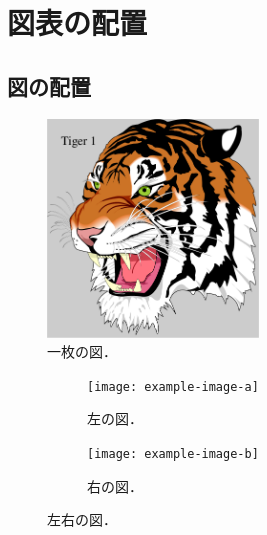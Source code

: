 \chapter{図表の配置}
\label{ch:figure_table}



\section{図の配置}
\label{sec:figure}


\begin{figure}
    \centering
    \includegraphics[width=0.5\textwidth]{figure/tiger1.pdf}
    \caption{一枚の図．}
    \label{fig:example}
\end{figure}


\begin{figure}[tp]
    \centering
    \begin{subfigure}{0.45\textwidth}
        \centering
        \texttt{[image: example-image-a]}
        \caption{左の図．}
        \label{fig:example_a}
    \end{subfigure}
    \hfill %
    \begin{subfigure}{0.45\textwidth}
        \centering
        \texttt{[image: example-image-b]}
        \caption{右の図．}
        \label{fig:example_b}
    \end{subfigure}
    \caption{左右の図．}
    \label{fig:example2}
\end{figure}


